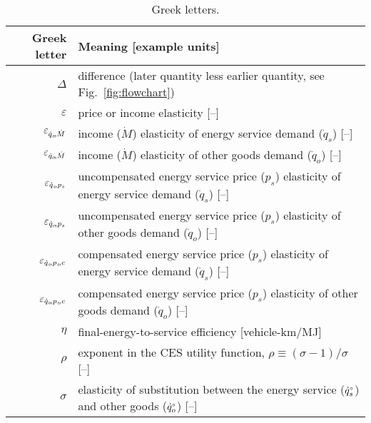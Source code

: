 
\begin{table}
\centering %
\caption{Greek letters.}
\begin{tabular}{r l}
  \toprule
  Greek letter & Meaning [example units] \\
  \midrule
  $\Delta$       & difference (later quantity less earlier quantity, see Fig.~\ref{fig:flowchart}) \\
  $\varepsilon$  & price or income elasticity [--] \\
  $\varepsilon_{\dot{q}_s\!,\dot{M}}$        & income ($\dot{M}$) elasticity of energy service demand ($\dot{q}_s$) [--] \\
  $\varepsilon_{\dot{q}_o\!,\dot{M}}$        & income ($\dot{M}$) elasticity of other goods demand ($\dot{q}_o$) [--] \\
  $\varepsilon_{\dot{q}_s\!,p_s}$     & uncompensated energy service price ($p_s$) elasticity of energy service demand ($\dot{q}_s$) [--] \\
  $\varepsilon_{\dot{q}_o\!,p_s}$     & uncompensated energy service price ($p_s$) elasticity of other goods demand ($\dot{q}_o$) [--] \\
  $\varepsilon_{\dot{q}_s\!,p_s\!,c}$      & compensated energy service price ($p_s$) elasticity of energy service demand ($\dot{q}_s$) [--] \\
  $\varepsilon_{\dot{q}_o\!,p_s\!,c}$      & compensated energy service price ($p_s$) elasticity of other goods demand ($\dot{q}_o$) [--] \\
  $\eta$         & final-energy-to-service efficiency [vehicle-km/MJ] \\
  $\rho$         & exponent in the CES utility function, $\rho \equiv (\sigma - 1) / \sigma$ [--] \\
  $\sigma$       & elasticity of substitution between the energy service (${}{\dot{q}}^{\scriptscriptstyle \circ}_s$) and other goods (${}{\dot{q}}^{\scriptscriptstyle \circ}_o$) [--] \\
  \bottomrule
\end{tabular}
\label{tab:greek}
\end{table}



